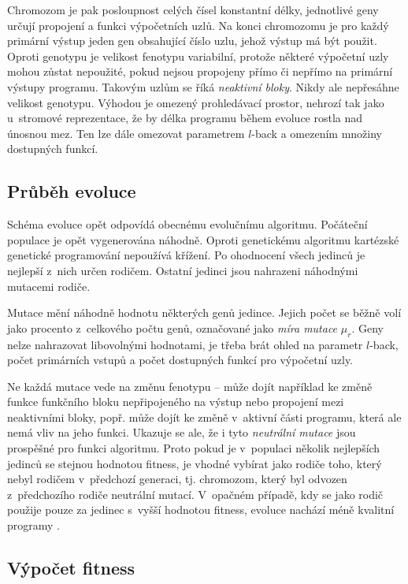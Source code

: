 Chromozom je pak posloupnost celých čísel konstantní délky, jednotlivé geny určují propojení a funkci výpočetních uzlů. Na konci chromozomu je pro každý primární výstup jeden gen obsahující číslo uzlu, jehož výstup má být použit. Oproti genotypu je velikost fenotypu variabilní, protože některé výpočetní uzly mohou zůstat nepoužité, pokud nejsou propojeny přímo či nepřímo na primární výstupy programu. Takovým uzlům se říká \emph{neaktivní bloky}. Nikdy ale nepřesáhne velikost genotypu. Výhodou je omezený prohledávací prostor, nehrozí tak jako u~stromové reprezentace, že by délka programu během evoluce rostla nad únosnou mez. Ten lze dále omezovat parametrem $l$-back a omezením množiny dostupných funkcí.


\subsection{Průběh evoluce}

Schéma evoluce opět odpovídá obecnému evolučnímu algoritmu. Počáteční populace je opět vygenerována náhodně. Oproti genetickému algoritmu kartézské genetické programování nepoužívá křížení. Po ohodnocení všech jedinců je nejlepší z~nich určen rodičem. Ostatní jedinci jsou nahrazeni náhodnými mutacemi rodiče.

Mutace mění náhodně hodnotu některých genů jedince. Jejich počet se běžně volí jako procento z~celkového počtu genů, označované jako \emph{míra mutace} $\mu_r$. Geny nelze nahrazovat libovolnými hodnotami, je třeba brát ohled na parametr $l$-back, počet primárních vstupů a počet dostupných funkcí pro výpočetní uzly.

Ne každá mutace vede na změnu fenotypu -- může dojít například ke změně funkce funkčního bloku nepřipojeného na výstup nebo propojení mezi neaktivními bloky, popř. může dojít ke změně v~aktivní části programu, která ale nemá vliv na jeho funkci. Ukazuje se ale, že i tyto \emph{neutrální mutace} jsou prospěšné pro funkci algoritmu. Proto pokud je v~populaci několik nejlepších jedinců se stejnou hodnotou fitness, je vhodné vybírat jako rodiče toho, který nebyl rodičem v~předchozí generaci, tj. chromozom, který byl odvozen z~předchozího rodiče neutrální mutací. V~opačném případě, kdy se jako rodič použije pouze za jedinec s~vyšší hodnotou fitness, evoluce nachází méně kvalitní programy \cite{ZelenaCGP}.


\subsection{Výpočet fitness}


